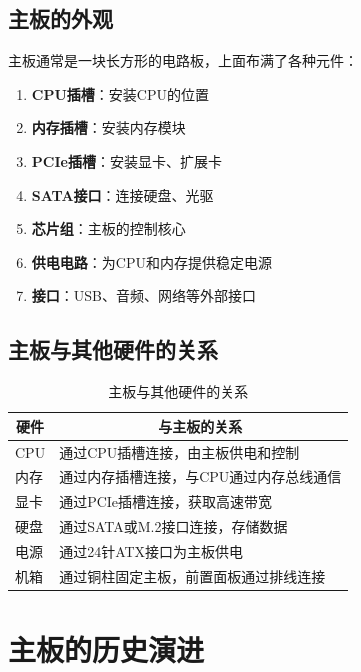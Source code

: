 \documentclass[12pt,UTF8]{ctexbook}
\begin{document}
\section{主板的外观}

主板通常是一块长方形的电路板，上面布满了各种元件：

\begin{enumerate}
    \item \textbf{CPU插槽}：安装CPU的位置
    \item \textbf{内存插槽}：安装内存模块
    \item \textbf{PCIe插槽}：安装显卡、扩展卡
    \item \textbf{SATA接口}：连接硬盘、光驱
    \item \textbf{芯片组}：主板的控制核心
    \item \textbf{供电电路}：为CPU和内存提供稳定电源
    \item \textbf{接口}：USB、音频、网络等外部接口
\end{enumerate}

\section{主板与其他硬件的关系}

\begin{table}[H]
    \centering
    \begin{tabularx}{\textwidth}{|p{3cm}|X|}
        \hline
        \multicolumn{1}{|c|}{\textbf{硬件}} & \multicolumn{1}{c|}{\textbf{与主板的关系}} \\
        \hline
        CPU & 通过CPU插槽连接，由主板供电和控制 \\
        \hline
        内存 & 通过内存插槽连接，与CPU通过内存总线通信 \\
        \hline
        显卡 & 通过PCIe插槽连接，获取高速带宽 \\
        \hline
        硬盘 & 通过SATA或M.2接口连接，存储数据 \\
        \hline
        电源 & 通过24针ATX接口为主板供电 \\
        \hline
        机箱 & 通过铜柱固定主板，前置面板通过排线连接 \\
        \hline
    \end{tabularx}
    \caption{主板与其他硬件的关系}
    \label{tab:motherboard_relations}
\end{table}

\chapter{主板的历史演进}
\end{document}
